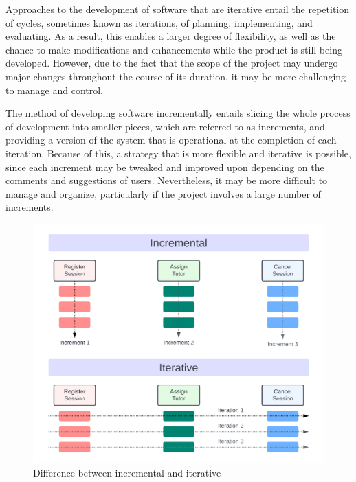 \begin{justify}
\noindent
Approaches to the development of software that are iterative entail the repetition of cycles, sometimes known as iterations, of planning, implementing, and evaluating. As a result, this enables a larger degree of flexibility, as well as the chance to make modifications and enhancements while the product is still being developed. However, due to the fact that the scope of the project may undergo major changes throughout the course of its duration, it may be more challenging to manage and control.

\vspace{0.25cm}
\newendline The method of developing software incrementally entails slicing the whole process of development into smaller pieces, which are referred to as increments, and providing a version of the system that is operational at the completion of each iteration. Because of this, a strategy that is more flexible and iterative is possible, since each increment may be tweaked and improved upon depending on the comments and suggestions of users. Nevertheless, it may be more difficult to manage and organize, particularly if the project involves a large number of increments.

\begin{figure}[H]
    \centerline{\includegraphics[width=150mm,scale=1]{figures/methodology/IncrementalVsIterative.png}}
    \caption{Difference between incremental and iterative}
    \label{IncrementalVsIterative}
\end{figure}


\end{justify}
